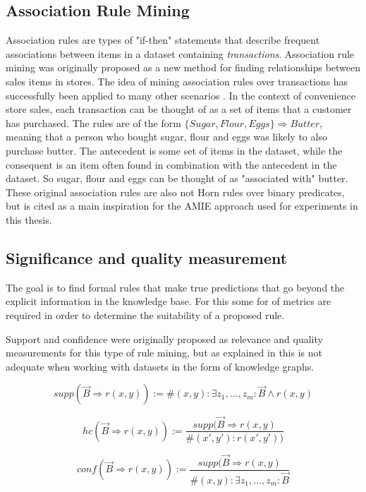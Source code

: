 \subsection{Association Rule Mining}
Association rules \cite{agrawal1993mining} are types of "if-then" statements that describe frequent associations between items in a dataset containing \textit{transactions}. Association rule mining was originally proposed as a new method for finding relationships between sales items in stores. The idea of mining association rules over transactions has successfully been applied to many other scenarios \cite{altaf2017applications, lin2002efficient}. In the context of convenience store sales, each transaction can be thought of as a set of items that a customer has purchased. The rules are of the form $\{Sugar, Flour, Eggs\} \Rightarrow Butter$, meaning that a person who bought sugar, flour and eggs was likely to also purchase butter. The antecedent is some set of items in the dataset, while the consequent is an item often found in combination with the antecedent in the dataset.  So sugar, flour and eggs can be thought of as "associated with" butter. These original association rules are also not Horn rules over binary predicates, but is cited as a main inspiration for the AMIE approach used for experiments in this thesis.

\subsection{Significance and quality measurement}
The goal is to find formal rules that make true predictions that go beyond the explicit information in the knowledge base. For this some for of metrics are required in order to determine the suitability of a proposed rule.




Support and confidence were originally proposed as relevance and quality measurements for this type of rule mining, but as explained in  this is not adequate when working with datasets in the form of knowledge graphs.

\[supp(\vec{B}\Rightarrow r(x, y)) :=  \# (x, y) : \exists z_1 , ...,z_m : \vec{B} \wedge r(x, y)\]

\[hc(\vec{B}\Rightarrow r(x, y)) := \frac{supp(\vec{B}\Rightarrow r(x, y)}{ \#(x', y'):r(x', y'))}\]

\[conf(\vec{B}\Rightarrow r(x, y)) := \frac{supp(\vec{B}\Rightarrow r(x, y)}{\#(x, y):\exists z_1 ,..., z_m : \vec{B}}\]

